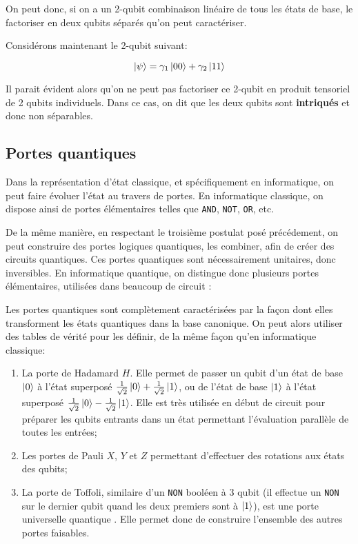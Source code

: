 On peut donc, si on a un 2-qubit combinaison linéaire de tous les états de base, le factoriser en deux qubits séparés qu'on peut caractériser.

\medbreak

Considérons maintenant le 2-qubit suivant:

\[
\ket{\psi} = \gamma_1 \ket{00} + \gamma_2 \ket{11}
\]

Il parait évident alors qu'on ne peut pas factoriser ce 2-qubit en produit tensoriel de 2 qubits individuels. Dans ce cas, on dit que les deux qubits sont \textbf{intriqués} et donc non séparables.


\subsection{Portes quantiques}
Dans la représentation d'état classique, et spécifiquement en informatique, on peut faire évoluer l'état au travers de portes. En informatique classique, on dispose ainsi de portes élémentaires telles que \texttt{AND}, \texttt{NOT}, \texttt{OR}, etc. 

De la même manière, en respectant le troisième postulat posé précédement, on peut construire des portes logiques quantiques, les combiner, afin de créer des circuits quantiques. Ces portes quantiques sont nécessairement unitaires, donc inversibles. En informatique quantique, on distingue donc plusieurs portes élémentaires, utilisées dans beaucoup de circuit \cite{Barenco95}:

Les portes quantiques sont complètement caractérisées par la façon dont elles transforment les états quantiques dans la base canonique. On peut alors utiliser des tables de vérité pour les définir, de la même façon qu'en informatique classique:

\begin{enumerate}
    \item La porte de Hadamard $H$. Elle permet de passer un qubit d'un état de base $\ket{0}$ à l'état superposé $\frac{1}{\sqrt{2}}\ket{0} + \frac{1}{\sqrt{2}}\ket{1}$, ou de l'état de base $\ket{1}$ à l'état superposé $\frac{1}{\sqrt{2}}\ket{0} - \frac{1}{\sqrt{2}}\ket{1}$. Elle est très utilisée en début de circuit pour préparer les qubits entrants dans un état permettant l'évaluation parallèle de toutes les entrées;
    \item Les portes de Pauli $X$, $Y$ et $Z$ permettant d'effectuer des rotations aux états des qubits;
    \item La porte de Toffoli, similaire d'un \texttt{NON} booléen à 3 qubit (il effectue un \texttt{NON} sur le dernier qubit quand les deux premiers sont à $\ket{1}$), est une porte universelle quantique \cite{shi2002toffoli}. Elle permet donc de construire l'ensemble des autres portes faisables.
\end{enumerate}

